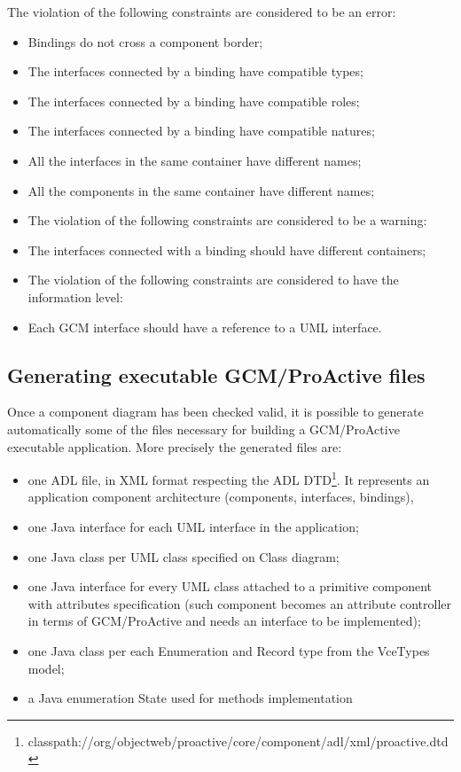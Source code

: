 \documentclass[12pt]{article}
\begin{document}
The violation of the following constraints are considered to be an error:
\begin{itemize}
\item
Bindings do not cross a component border;
\item
The interfaces connected by a binding have compatible types;
\item
The interfaces connected by a binding have compatible roles;
\item
The interfaces connected by a binding have compatible natures;
\item
All the interfaces in the same container have different names;
\item
All the components in the same container have different names;
\item
The violation of the following constraints are considered to be a warning:
\item
The interfaces connected with a binding should have different containers;
\item
The violation of the following constraints are considered to have the information level:
\item
Each GCM interface should have a reference to a UML interface.
\end{itemize}

\subsection{Generating executable GCM/ProActive files}
Once a component diagram has been checked valid, it is possible to generate automatically some of the files necessary for building a GCM/ProActive executable application. More precisely the generated files are:
\begin{itemize}
\item
one ADL file, in XML format respecting the ADL DTD\footnote{classpath://org/objectweb/proactive/core/component/adl/xml/proactive.dtd}. It represents an application component architecture (components, interfaces, bindings),
\item
one Java interface for each UML interface in the application;
\item
one Java class per UML class specified on Class diagram;
\item
one Java interface for every UML class attached to a primitive component with attributes specification (such component becomes an attribute controller in terms of GCM/ProActive and needs an interface to be implemented);
\item
one Java class per each Enumeration and Record type from the VceTypes model;
\item
a Java enumeration State used for methods implementation
\end{itemize}
\end{document}

